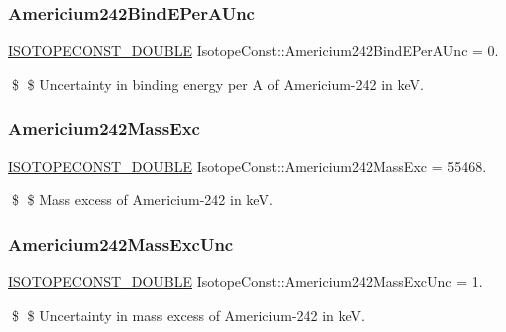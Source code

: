 \subsubsection{\texorpdfstring{Americium242\+Bind\+E\+Per\+A\+Unc}{Americium242BindEPerAUnc}}
{\footnotesize\ttfamily \mbox{\hyperlink{group___isotope_const-_macros_ga8f45a7272ce02c0b4c65c44636ed719a}{I\+S\+O\+T\+O\+P\+E\+C\+O\+N\+S\+T\+\_\+\+D\+O\+U\+B\+LE}} Isotope\+Const\+::\+Americium242\+Bind\+E\+Per\+A\+Unc = 0.}

\$ \$ Uncertainty in binding energy per A of Americium-\/242 in keV. \mbox{\label{group___isotope_const-_americium-_am242_ga9697128af6708a13d7454e02e7813b61}} 
\subsubsection{\texorpdfstring{Americium242\+Mass\+Exc}{Americium242MassExc}}
{\footnotesize\ttfamily \mbox{\hyperlink{group___isotope_const-_macros_ga8f45a7272ce02c0b4c65c44636ed719a}{I\+S\+O\+T\+O\+P\+E\+C\+O\+N\+S\+T\+\_\+\+D\+O\+U\+B\+LE}} Isotope\+Const\+::\+Americium242\+Mass\+Exc = 55468.}

\$ \$ Mass excess of Americium-\/242 in keV. \mbox{\label{group___isotope_const-_americium-_am242_gaa59b28033fc93fdb1d6a11ebe84d2ce1}} 
\subsubsection{\texorpdfstring{Americium242\+Mass\+Exc\+Unc}{Americium242MassExcUnc}}
{\footnotesize\ttfamily \mbox{\hyperlink{group___isotope_const-_macros_ga8f45a7272ce02c0b4c65c44636ed719a}{I\+S\+O\+T\+O\+P\+E\+C\+O\+N\+S\+T\+\_\+\+D\+O\+U\+B\+LE}} Isotope\+Const\+::\+Americium242\+Mass\+Exc\+Unc = 1.}

\$ \$ Uncertainty in mass excess of Americium-\/242 in keV. \mbox{\label{group___isotope_const-_americium-_am242_gafa84d48a21481365eab0c6b12430a343}} 
